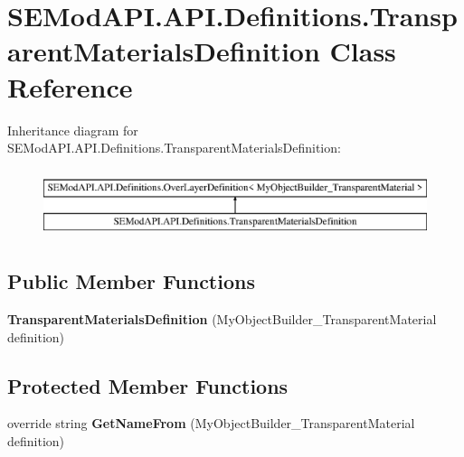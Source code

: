 \hypertarget{class_s_e_mod_a_p_i_1_1_a_p_i_1_1_definitions_1_1_transparent_materials_definition}{}\section{S\+E\+Mod\+A\+P\+I.\+A\+P\+I.\+Definitions.\+Transparent\+Materials\+Definition Class Reference}
\label{class_s_e_mod_a_p_i_1_1_a_p_i_1_1_definitions_1_1_transparent_materials_definition}
Inheritance diagram for S\+E\+Mod\+A\+P\+I.\+A\+P\+I.\+Definitions.\+Transparent\+Materials\+Definition\+:\begin{figure}[H]
\begin{center}
\leavevmode
\includegraphics[height=2.000000cm]{class_s_e_mod_a_p_i_1_1_a_p_i_1_1_definitions_1_1_transparent_materials_definition}
\end{center}
\end{figure}
\subsection*{Public Member Functions}
\begin{DoxyCompactItemize}
\item 
\hypertarget{class_s_e_mod_a_p_i_1_1_a_p_i_1_1_definitions_1_1_transparent_materials_definition_a0f119b6365a72d4b7a82d7331c5a8ef0}{}{\bfseries Transparent\+Materials\+Definition} (My\+Object\+Builder\+\_\+\+Transparent\+Material definition)\label{class_s_e_mod_a_p_i_1_1_a_p_i_1_1_definitions_1_1_transparent_materials_definition_a0f119b6365a72d4b7a82d7331c5a8ef0}

\end{DoxyCompactItemize}
\subsection*{Protected Member Functions}
\begin{DoxyCompactItemize}
\item 
\hypertarget{class_s_e_mod_a_p_i_1_1_a_p_i_1_1_definitions_1_1_transparent_materials_definition_a07405dc40fa3ca76edc3e26af6d5bfde}{}override string {\bfseries Get\+Name\+From} (My\+Object\+Builder\+\_\+\+Transparent\+Material definition)\label{class_s_e_mod_a_p_i_1_1_a_p_i_1_1_definitions_1_1_transparent_materials_definition_a07405dc40fa3ca76edc3e26af6d5bfde}

\end{DoxyCompactItemize}
